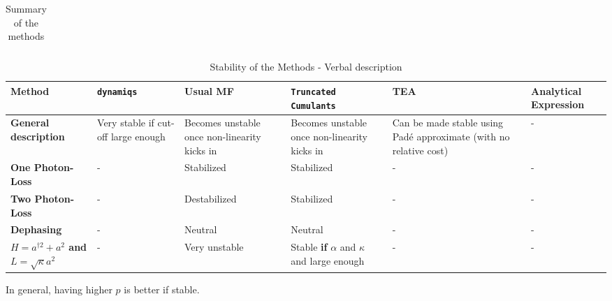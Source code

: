 \begin{landscape}
\begin{center}
\begin{table}[h!]
\begin{tabular}{|p{3.5cm}|p{4cm}|p{4cm}|p{4cm}|p{4cm}|p{4cm}|}
        \hline
    \end{tabular}
    \caption{Summary of the methods}
    \label{tab:summ-table}
\end{table}
\end{center}
\end{landscape}

\begin{landscape}
\begin{center}
    \begin{table}[h!]
    \centering
    \begin{tabular}{|p{3.5cm}|p{4cm}|p{4cm}|p{4cm}|p{4cm}|p{4cm}|}
        \hline
        \textbf{Method} & \texttt{dynamiqs}~\cite{dynamiqs} & \textbf{Usual MF} & \texttt{Truncated Cumulants} & \textbf{TEA} & \textbf{Analytical Expression} \\
        \hline
        \textbf{General description} & Very stable if cut-off large enough & Becomes unstable once non-linearity kicks in & Becomes unstable once non-linearity kicks in & Can be made stable using Padé approximate (with no relative cost) & - \\
        \hline
        \textbf{One Photon-Loss} & - & Stabilized & Stabilized & - & - \\
        \hline
        \textbf{Two Photon-Loss} & - & Destabilized & Stabilized & - & - \\
        \hline
        \textbf{Dephasing} & - & Neutral & Neutral & - & - \\
        \hline
        \textbf{$H=a^{\dagger 2} + a^2$ and $L = \sqrt{\kappa} a^2$} & - & Very unstable & Stable \textbf{if} $\alpha$ and $\kappa$ and large enough & - & - \\
        \hline
        
    \end{tabular}
    \caption{Stability of the Methods - Verbal description}
    \label{tab:summ-table-stab}
\end{table}
\end{center}

In general, having higher $p$ is better if stable.
\end{landscape}

